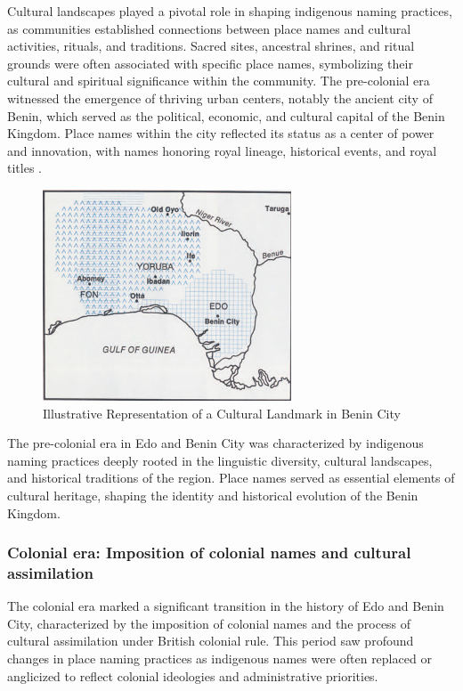 Cultural landscapes played a pivotal role in shaping indigenous naming practices, as communities established connections between place names and cultural activities, rituals, and traditions. Sacred sites, ancestral shrines, and ritual grounds were often associated with specific place names, symbolizing their cultural and spiritual significance within the community.
The pre-colonial era witnessed the emergence of thriving urban centers, notably the ancient city of Benin, which served as the political, economic, and cultural capital of the Benin Kingdom. Place names within the city reflected its status as a center of power and innovation, with names honoring royal lineage, historical events, and royal titles \cite{egharevba1968short}.

\begin{figure}[h!]
    \centering
    \includegraphics[width=0.9\linewidth]{imauuge.png}
    \caption{Illustrative Representation of a Cultural Landmark in Benin City}
    \label{fig:cultural_landmark_benin}
\end{figure}

The pre-colonial era in Edo and Benin City was characterized by indigenous naming practices deeply rooted in the linguistic diversity, cultural landscapes, and historical traditions of the region. Place names served as essential elements of cultural heritage, shaping the identity and historical evolution of the Benin Kingdom.

\subsubsection{Colonial era: Imposition of colonial names and cultural assimilation}
The colonial era marked a significant transition in the history of Edo and Benin City, characterized by the imposition of colonial names and the process of cultural assimilation under British colonial rule. This period saw profound changes in place naming practices as indigenous names were often replaced or anglicized to reflect colonial ideologies and administrative priorities.

